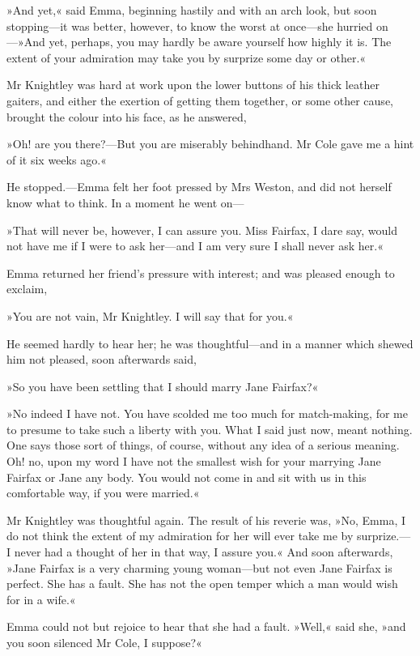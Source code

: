 »And yet,« said Emma, beginning hastily and with an arch look, but soon stopping—it was better, however, to know the worst at once—she hurried on—»And yet, perhaps, you may hardly be aware yourself how highly it is. The extent of your admiration may take you by surprize some day or other.«

Mr Knightley was hard at work upon the lower buttons of his thick leather gaiters, and either the exertion of getting them together, or some other cause, brought the colour into his face, as he answered,

»Oh! are you there?—But you are miserably behindhand. Mr Cole gave me a hint of it six weeks ago.«

He stopped.—Emma felt her foot pressed by Mrs Weston, and did not herself know what to think. In a moment he went on—

»That will never be, however, I can assure you. Miss Fairfax, I dare say, would not have me if I were to ask her—and I am very sure I shall never ask her.«

Emma returned her friend's pressure with interest; and was pleased enough to exclaim,

»You are not vain, Mr Knightley. I will say that for you.«

He seemed hardly to hear her; he was thoughtful—and in a manner which shewed him not pleased, soon afterwards said,

»So you have been settling that I should marry Jane Fairfax?«

»No indeed I have not. You have scolded me too much for match-making, for me to presume to take such a liberty with you. What I said just now, meant nothing. One says those sort of things, of course, without any idea of a serious meaning. Oh! no, upon my word I have not the smallest wish for your marrying Jane Fairfax or Jane any body. You would not come in and sit with us in this comfortable way, if you were married.«

Mr Knightley was thoughtful again. The result of his reverie was, »No, Emma, I do not think the extent of my admiration for her will ever take me by surprize.—I never had a thought of her in that way, I assure you.« And soon afterwards, »Jane Fairfax is a very charming young woman—but not even Jane Fairfax is perfect. She has a fault. She has not the open temper which a man would wish for in a wife.«

Emma could not but rejoice to hear that she had a fault. »Well,« said she, »and you soon silenced Mr Cole, I suppose?«

